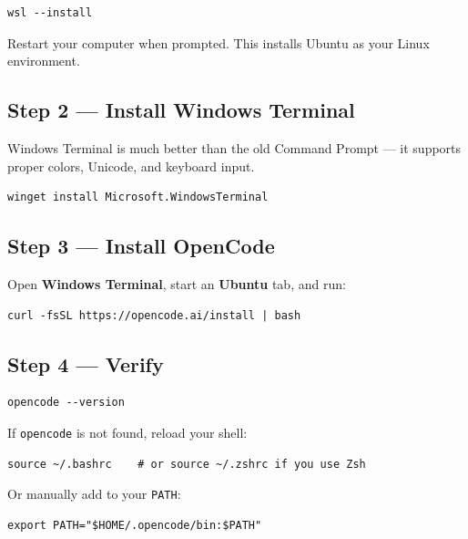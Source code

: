 \documentclass[12pt]{article}
\begin{document}
\begin{lstlisting}[style=term]
wsl --install
\end{lstlisting}

Restart your computer when prompted.  This installs Ubuntu as your Linux environment.

\subsection{Step 2 --- Install Windows Terminal}

Windows Terminal is much better than the old Command Prompt --- it supports proper colors, Unicode, and keyboard input.

\begin{lstlisting}[style=term]
winget install Microsoft.WindowsTerminal
\end{lstlisting}

\subsection{Step 3 --- Install OpenCode}

Open \textbf{Windows Terminal}, start an \textbf{Ubuntu} tab, and run:

\begin{lstlisting}[style=term]
curl -fsSL https://opencode.ai/install | bash
\end{lstlisting}

\subsection{Step 4 --- Verify}

\begin{lstlisting}[style=term]
opencode --version
\end{lstlisting}

\begin{alert-box}
If \texttt{opencode} is not found, reload your shell:
\begin{lstlisting}[style=term]
source ~/.bashrc    # or source ~/.zshrc if you use Zsh
\end{lstlisting}
Or manually add to your \texttt{PATH}:
\begin{lstlisting}[style=term]
export PATH="$HOME/.opencode/bin:$PATH"
\end{lstlisting}
\end{alert-box}
\end{document}
